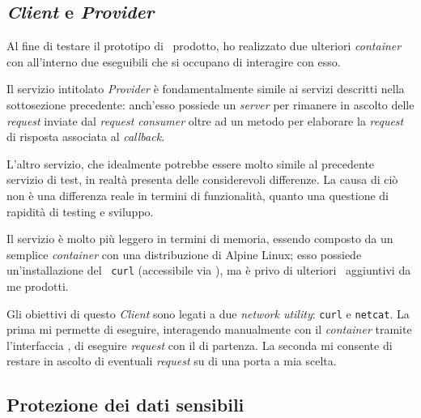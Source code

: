 \subsection{ \textit{Client} e  \textit{Provider} }

Al fine di testare il prototipo di \middleware\ prodotto, ho realizzato due ulteriori \textit{container} con all'interno due eseguibili che si occupano di interagire con esso.

Il servizio intitolato  \textit{Provider} è fondamentalmente simile ai servizi descritti nella sottosezione precedente: anch'esso possiede un  \textit{server} per rimanere in ascolto delle  \textit{request} inviate dal \textit{request consumer} oltre ad un metodo per elaborare la  \textit{request} di risposta associata al \textit{callback}.

L'altro servizio, che idealmente potrebbe essere molto simile al precedente servizio di test, in realtà presenta delle considerevoli differenze.
La causa di ciò non è una differenza reale in termini di funzionalità, quanto una questione di rapidità di testing e sviluppo.

Il servizio è molto più leggero in termini di memoria, essendo composto da un semplice \textit{container} con una distribuzione di Alpine Linux; esso possiede un'installazione del \software\ \texttt{curl} (accessibile via ), ma è privo di ulteriori \software\ aggiuntivi da me prodotti.

Gli obiettivi di questo  \textit{Client} sono legati a due \textit{network utility}: \texttt{curl} e \texttt{netcat}.
La prima mi permette di eseguire, interagendo manualmente con il \textit{container} tramite l'interfaccia , di eseguire  \textit{request} con il  di partenza.
La seconda mi consente di restare in ascolto di eventuali \textit{request} su di una porta a mia scelta.


\subsection{Protezione dei dati sensibili}

